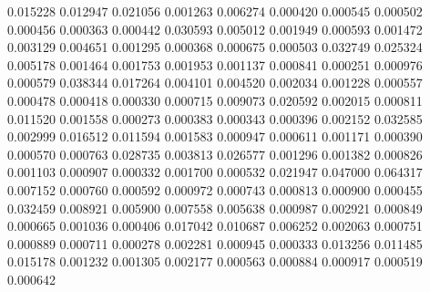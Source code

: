 0.015228
0.012947
0.021056
0.001263
0.006274
0.000420
0.000545
0.000502
0.000456
0.000363
0.000442
0.030593
0.005012
0.001949
0.000593
0.001472
0.003129
0.004651
0.001295
0.000368
0.000675
0.000503
0.032749
0.025324
0.005178
0.001464
0.001753
0.001953
0.001137
0.000841
0.000251
0.000976
0.000579
0.038344
0.017264
0.004101
0.004520
0.002034
0.001228
0.000557
0.000478
0.000418
0.000330
0.000715
0.009073
0.020592
0.002015
0.000811
0.011520
0.001558
0.000273
0.000383
0.000343
0.000396
0.002152
0.032585
0.002999
0.016512
0.011594
0.001583
0.000947
0.000611
0.001171
0.000390
0.000570
0.000763
0.028735
0.003813
0.026577
0.001296
0.001382
0.000826
0.001103
0.000907
0.000332
0.001700
0.000532
0.021947
0.047000
0.064317
0.007152
0.000760
0.000592
0.000972
0.000743
0.000813
0.000900
0.000455
0.032459
0.008921
0.005900
0.007558
0.005638
0.000987
0.002921
0.000849
0.000665
0.001036
0.000406
0.017042
0.010687
0.006252
0.002063
0.000751
0.000889
0.000711
0.000278
0.002281
0.000945
0.000333
0.013256
0.011485
0.015178
0.001232
0.001305
0.002177
0.000563
0.000884
0.000917
0.000519
0.000642
